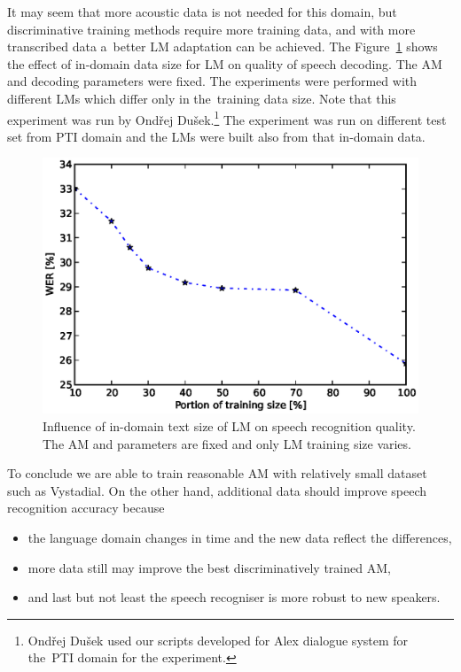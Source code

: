 It may seem that more acoustic data is not needed for this domain, but discriminative training methods require more training data, and with more transcribed data a~better \ac{LM} adaptation can be achieved.
The Figure~\ref{fig:partials_lm} shows the effect of in-domain data size for \ac{LM} on quality of speech decoding.
The \ac{AM}  and decoding parameters were fixed.
The experiments were performed with different \acp{LM} which differ only in the~training data size. 
Note that this experiment was run by Ondřej Dušek.\footnote{Ondřej Dušek used our scripts developed for Alex dialogue system for the~\ac{PTI} domain for the experiment.}
The experiment was run on different test set from \acf{PTI} domain and the \acp{LM} were built also from that in-domain data.
\begin{figure}[!htp]
    \begin{center}
    \includegraphics[scale=0.7]{images/partial-lm-tri2b-bmmi.ps}
    \caption{Influence of in-domain text size of \ac{LM} on speech recognition quality. The \ac{AM}  and parameters are fixed and only \ac{LM} training size varies.}
    \label{fig:partials_lm} 
    \end{center}
\end{figure}

To conclude we are able to train reasonable \ac{AM} with relatively small dataset such as Vystadial.
On the other hand, additional data should improve speech recognition accuracy because
\begin{itemize}
    \item the language domain changes in time and the new data reflect the differences,
    \item more data still may improve the best discriminatively trained \ac{AM},
    \item and last but not least the speech recogniser is more robust to new speakers.
\end{itemize}


